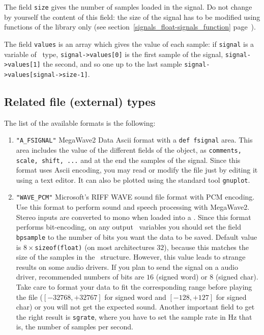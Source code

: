 The field \verb+size+ gives the number of samples loaded in the signal.
Do not change by yourself the content of this field: the size of the signal
has to be modified using functions of the library only 
(see section~\ref{signals_float-signals_function} page~\pageref{signals_float-signals_function}).

The field \verb+values+ is an array which gives the value of each sample:
if \verb+signal+ is a variable of \fsignal\ type, \verb+signal->values[0]+
is the first sample of the signal, \verb+signal->values[1]+ the second,
and so one up to the last sample  \verb+signal->values[signal->size-1]+.

\subsection{Related file (external) types}
\label{signals_float-file_type}

The list of the available formats is the following:
\begin{enumerate}
\item \verb+"A_FSIGNAL"+ 
MegaWave2 Data Ascii format with a \verb+def fsignal+ area.
This area includes the value of the different fields of the object, as
\verb+comments, scale, shift, ...+ and at the end the samples of the signal.
Since this format uses Ascii encoding, you may read or modify the file just by
editing it using a text editor.
It can also be plotted using the standard tool {\tt gnuplot}.

\item \verb+"WAVE_PCM"+  
Microsoft's RIFF WAVE sound file format with PCM encoding.
Use this format to perform sound and 
speech processing with MegaWave2.
Stereo inputs are converted to mono when loaded into a \fsignal.
Since this format performs bit-encoding, on any output \fsignal\ variables
you should set the field \verb+bpsample+ to the number of bits you want the
data to be saved. Default value is $8 \times $\verb+sizeof(float)+ (on most
architectures $32$), because this matches the size of the samples in the
\fsignal\ structure. 
However, this value leads to strange results on some audio drivers. 
If you plan to send the
signal on a audio driver, 
recommended numbers of bits are $16$ (signed word) 
or $8$ (signed char). Take care to format your data to fit the corresponding 
range before playing the file ($[-32768,+32767]$ for signed word and 
$[-128,+127]$ for signed char) or you will not get the expected sound.
Another important field to get the right result is \verb+sgrate+, where you
have to set the sample rate in Hz that is, the number of samples per second.

\end{enumerate}


